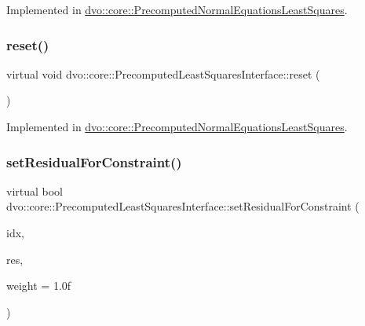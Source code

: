 Implemented in \mbox{\hyperlink{classdvo_1_1core_1_1_precomputed_normal_equations_least_squares_a514bd37f6bbfeb8cb1788e6fdabc0e32}{dvo\+::core\+::\+Precomputed\+Normal\+Equations\+Least\+Squares}}.

\mbox{\label{classdvo_1_1core_1_1_precomputed_least_squares_interface_ae4b138a17c7959e780a0e30e935596e8}} 
\subsubsection{\texorpdfstring{reset()}{reset()}}
{\footnotesize\ttfamily virtual void dvo\+::core\+::\+Precomputed\+Least\+Squares\+Interface\+::reset (\begin{DoxyParamCaption}{ }\end{DoxyParamCaption})\hspace{0.3cm}{\ttfamily [pure virtual]}}



Implemented in \mbox{\hyperlink{classdvo_1_1core_1_1_precomputed_normal_equations_least_squares_a591e3030f4736c580e37338ba747bc83}{dvo\+::core\+::\+Precomputed\+Normal\+Equations\+Least\+Squares}}.

\mbox{\label{classdvo_1_1core_1_1_precomputed_least_squares_interface_a55870a4fa167484edf3e9b8120ad3232}} 
\subsubsection{\texorpdfstring{set\+Residual\+For\+Constraint()}{setResidualForConstraint()}}
{\footnotesize\ttfamily virtual bool dvo\+::core\+::\+Precomputed\+Least\+Squares\+Interface\+::set\+Residual\+For\+Constraint (\begin{DoxyParamCaption}\item[{const size\+\_\+t \&}]{idx,  }\item[{const \mbox{\hyperlink{namespacedvo_1_1core_ab9c199d221775a923e2549ad7e15c323}{Num\+Type}} \&}]{res,  }\item[{const \mbox{\hyperlink{namespacedvo_1_1core_ab9c199d221775a923e2549ad7e15c323}{Num\+Type}} \&}]{weight = {\ttfamily 1.0f} }\end{DoxyParamCaption})\hspace{0.3cm}{\ttfamily [pure virtual]}}



